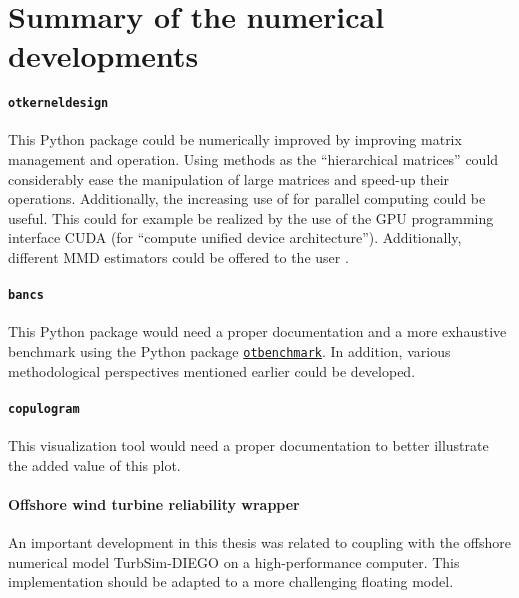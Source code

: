 \section*{Summary of the numerical developments}

\paragraph{\texttt{otkerneldesign}}
This Python package could be numerically improved by improving matrix management and operation. 
Using methods as the ``hierarchical matrices'' \citep{borm_2003_hmat} could considerably ease the manipulation of large matrices and speed-up their operations.  
Additionally, the increasing use of  for parallel computing could be useful. 
This could for example be realized by the use of the GPU programming interface CUDA (for ``compute unified device architecture''). 
Additionally, different MMD estimators could be offered to the user \citep{gretton_2006}. 


\paragraph{\texttt{bancs}}
This Python package would need a proper documentation and a more exhaustive benchmark using the Python package \href{https://github.com/mbaudin47/otbenchmark/}{\texttt{otbenchmark}}\footnotemark. 
In addition, various methodological perspectives mentioned earlier could be developed. 


\paragraph{\texttt{copulogram}}
This visualization tool would need a proper documentation to better illustrate the added value of this plot. 

\paragraph{Offshore wind turbine reliability wrapper}
An important development in this thesis was related to coupling \ots with the offshore numerical model TurbSim-DIEGO on a high-performance computer. 
This implementation should be adapted to a more challenging floating model.